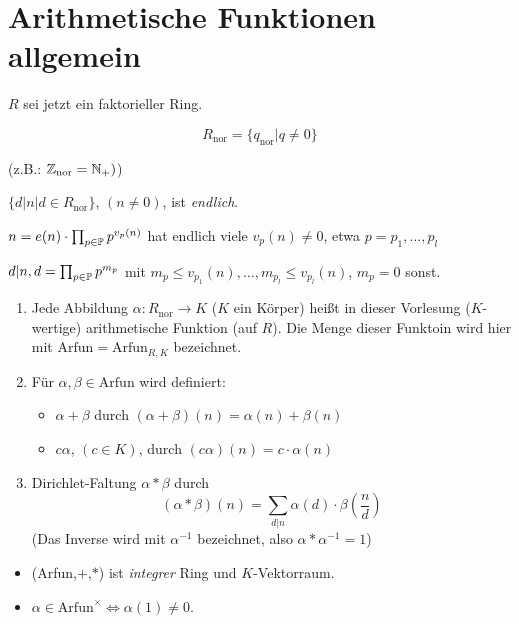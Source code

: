 \documentclass[a4paper,DIV15,BCOR12mm]{article}
\begin{document}
\section{Arithmetische Funktionen allgemein}

$R$ sei jetzt ein faktorieller Ring.
\begin{definition}
\[ R_\text{nor} = \{ q_{\text{nor}} | q \ne 0 \} \]
\end{definition}
(z.B.: $\mathbb{Z}_\text{nor} = \mathbb{N}_+)$)

\begin{bemerkung}
$\{d|n \big | d\in R_\text{nor}\}$, $(n\ne 0)$, ist \emph{endlich}.

$n= e(n) \cdot \prod_{p\in\mathbb{P}} p^{v_p(n)}$ hat endlich viele
$v_p(n)\ne 0$, etwa $p=p_1,\ldots,p_l$

$d|n, d=\prod_{p\in\mathbb{P}} p^{m_p}$ mit $m_p\le v_{p_1}(n), \ldots,
m_{p_l} \le v_{p_l}(n)$, $m_p=0$ sonst.
\end{bemerkung}

\begin{definition}
\begin{enumerate}
\item Jede Abbildung $\alpha: R_\text{nor} \to K$ ($K$ ein Körper) heißt in dieser Vorlesung ($K$-wertige) arithmetische Funktion (auf $R$). Die Menge dieser Funktoin wird hier mit $\text{Arfun} = \text{Arfun}_{R,K}$ bezeichnet.
\item Für $\alpha,\beta \in \text{Arfun}$ wird definiert:
\begin{itemize}
\item $\alpha + \beta$ durch $(\alpha + \beta)(n) = \alpha(n) + \beta(n)$
\item $c\alpha$, $(c\in K)$, durch $(c\alpha)(n) = c \cdot \alpha(n)$
\end{itemize}
\item Dirichlet-Faltung $\alpha * \beta$ durch
\[ (\alpha * \beta) (n)  = \sum_{d|n} \alpha(d) \cdot \beta(\frac nd) \]
(Das Inverse wird mit $\alpha^{-1}$ bezeichnet, also $\alpha *
\alpha^{-1} = 1$)
\end{enumerate}
\end{definition}

\begin{satz}
\begin{itemize}
\item (Arfun,$+$,$*$) ist \emph{integrer} Ring und $K$-Vektorraum.
\item $\alpha\in\text{Arfun}^\times \iff \alpha(1) \ne 0$. \end{itemize}
\end{satz}
\end{document}
